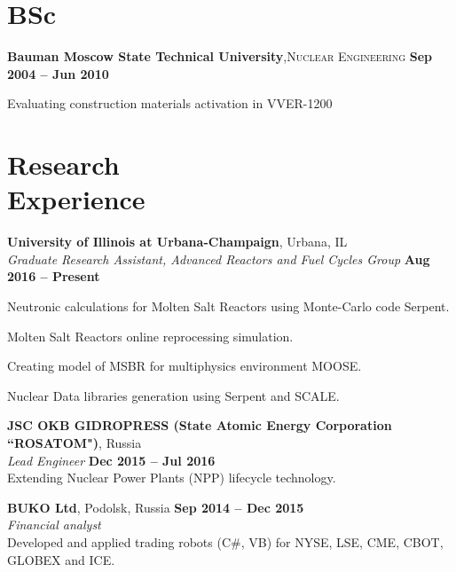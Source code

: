 \documentclass[margin,line]{resume}
\begin{document}
\begin{resume}
    \section{\mysidestyle BSc}
    \textbf{Bauman Moscow State Technical University},\textsc{Nuclear Engineering}\hfill \textbf{ Sep 2004 -- Jun 2010}\vspace{-3mm}\\\vspace{-1mm}%
    \begin{list2}
	\item Evaluating construction materials activation in VVER-1200
    \end{list2}\vspace{-1.5mm}
    \section{\mysidestyle Research\\Experience}
    \textbf{University of Illinois at Urbana-Champaign}, Urbana, IL\\
		\textsl{Graduate Research Assistant, Advanced Reactors and Fuel Cycles Group} \hfill \textbf{Aug 2016 -- Present}\\
                \vspace{-4mm}\begin{list2}
                \item Neutronic calculations for Molten Salt Reactors using Monte-Carlo code Serpent.
				\item Molten Salt Reactors online reprocessing simulation.
				\item Creating model of MSBR for multiphysics environment MOOSE.
				\item Nuclear Data libraries generation using Serpent and SCALE.
                \end{list2}

    \textbf{JSC OKB GIDROPRESS (State Atomic Energy Corporation ``ROSATOM")}, Russia \\
		\textsl{Lead Engineer} \hfill \textbf{Dec 2015 -- Jul 2016}\\
                Extending Nuclear Power Plants (NPP) lifecycle technology.

    \textbf{BUKO Ltd}, Podolsk, Russia \hfill \textbf{Sep 2014 -- Dec 2015}\\
		\textsl{Financial analyst}\\
		Developed and applied trading robots (C\#, VB) for NYSE, LSE, CME, CBOT, GLOBEX and ICE.


\end{resume}
\end{document}
